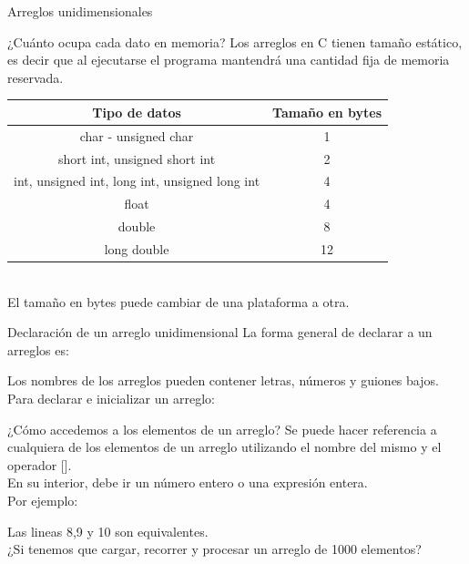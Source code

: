\documentclass[xcolor=pdftex,table,11pt]{beamer}
\begin{document}
\begin{frame}{Arreglos unidimensionales}
\begin{block}{¿Cuánto ocupa cada dato en memoria?}
Los arreglos en C tienen tamaño estático, es decir que al ejecutarse el programa mantendrá una cantidad fija de memoria reservada.

\end{block}
\vspace{0.5cm}

\begin{tabular}{|c|c|}
\hline 
\textbf{Tipo de datos} & \textbf{Tamaño en bytes} \\ 
\hline 
char - unsigned char & 1\\ 
\hline 
short int, unsigned short int & 2 \\ 
\hline 
int, unsigned int, long int, unsigned long int & 4 \\ 
\hline 
float & 4 \\ 
\hline 
double & 8 \\ 
\hline
long double & 12\\ 
\hline 
\end{tabular} 
\vspace{0.3cm}
\\
El tamaño en bytes puede cambiar de una plataforma a otra.


\href{https://www.profesionalreview.com/2018/12/12/unidades-de-medida/}{}

\end{frame}


\begin{frame}{Declaración de un arreglo unidimensional}
La forma general de declarar a un arreglos es:

\codesetstylefrombeamer
{}

Los nombres de los arreglos pueden contener letras, números  y guiones bajos.\\

\vspace{0.5cm}
Para declarar e inicializar un arreglo:
\end{frame}



\begin{frame}{¿Cómo accedemos a los elementos de un arreglo?}
Se puede hacer referencia a cualquiera de los elementos de un arreglo  utilizando el nombre del mismo y el operador []. \\
En su interior, debe ir un número entero o una expresión entera. \\
Por ejemplo:

\codesetstylefrombeamer
{}

Las lineas 8,9 y 10 son equivalentes.\\

¿Si tenemos que cargar, recorrer y procesar un arreglo de 1000 elementos?
\end{frame}
\end{document}

